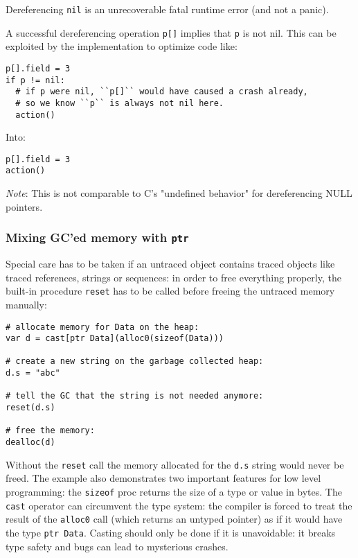 Dereferencing \texttt{nil} is an unrecoverable fatal runtime error (and
not a panic).

A successful dereferencing operation \texttt{p{[}{]}} implies that
\texttt{p} is not nil. This can be exploited by the implementation to
optimize code like:

\begin{verbatim}
p[].field = 3
if p != nil:
  # if p were nil, ``p[]`` would have caused a crash already,
  # so we know ``p`` is always not nil here.
  action()
\end{verbatim}

Into:

\begin{verbatim}
p[].field = 3
action()
\end{verbatim}

\emph{Note}: This is not comparable to C's "undefined behavior" for
dereferencing NULL pointers.

\hypertarget{mixing-gced-memory-with-ptr}{%
\subsubsection{\texorpdfstring{Mixing GC'ed memory with
\texttt{ptr}}{Mixing GC'ed memory with ptr}}\label{mixing-gced-memory-with-ptr}}

Special care has to be taken if an untraced object contains traced
objects like traced references, strings or sequences: in order to free
everything properly, the built-in procedure \texttt{reset} has to be
called before freeing the untraced memory manually:

\begin{verbatim}
# allocate memory for Data on the heap:
var d = cast[ptr Data](alloc0(sizeof(Data)))

# create a new string on the garbage collected heap:
d.s = "abc"

# tell the GC that the string is not needed anymore:
reset(d.s)

# free the memory:
dealloc(d)
\end{verbatim}

Without the \texttt{reset} call the memory allocated for the
\texttt{d.s} string would never be freed. The example also demonstrates
two important features for low level programming: the \texttt{sizeof}
proc returns the size of a type or value in bytes. The \texttt{cast}
operator can circumvent the type system: the compiler is forced to treat
the result of the \texttt{alloc0} call (which returns an untyped
pointer) as if it would have the type \texttt{ptr\ Data}. Casting should
only be done if it is unavoidable: it breaks type safety and bugs can
lead to mysterious crashes.

